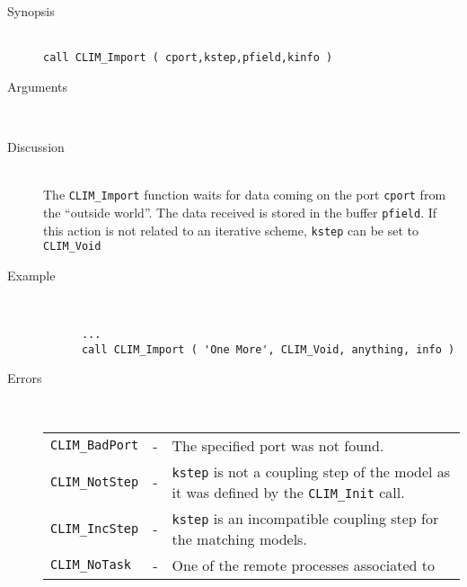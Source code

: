 \begin{description}
  \item[Synopsis]~ \\[10pt]
    {\tt call CLIM\_Import ( cport,kstep,pfield,kinfo )}
  \item[Arguments]~
  \item[Discussion]~\\[10pt]
    The {\tt CLIM\_Import} function waits for data coming on the port
    {\tt cport} from the ``outside world''.
    The data received is stored in the buffer {\tt pfield}.
    If this action is not related to an iterative scheme,
    {\tt kstep} can be set to {\tt CLIM\_Void}
  \item[Example]~
    \begin{verbatim}
      ...
      call CLIM_Import ( 'One More', CLIM_Void, anything, info )
    \end{verbatim}
  \item[Errors]~\\[10pt]
    \begin{tabular}{l l p{10cm} }
      {\tt CLIM\_BadPort} & - & The specified port was not found. \\
      {\tt CLIM\_NotStep} & - & {\tt kstep} is not a coupling step of
the model as it was defined by the {\tt CLIM\_Init} call. \\
      {\tt CLIM\_IncStep} & - & {\tt kstep} is an incompatible coupling
step for the matching models. \\
      {\tt CLIM\_NoTask} & - & One of the remote processes associated to

\end{tabular}
\end{description}
